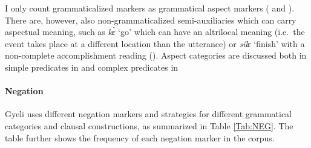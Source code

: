 I only count grammaticalized markers as grammatical aspect markers ( and ). There are, however,  also non-grammaticalized semi-auxiliaries which can carry aspectual meaning, such as {\itshape kɛ̀} `go' which can have an altrilocal meaning (i.e.\ the event takes place at a different location than the utterance) or {\itshape sílɛ} `finish' with a non-complete accomplishment reading ().
Aspect categories are discussed both in simple predicates in  and complex predicates in 








\paragraph{Negation}



Gyeli uses different negation markers and strategies for different grammatical categories and clausal constructions, as summarized in Table \ref{Tab:NEG}. The table further shows the frequency of each negation marker in the corpus.

